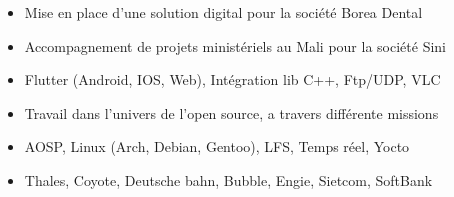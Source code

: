 \documentclass[10pt,a4paper]{altacv}
\begin{document}
\divider

\begin{itemize}
\item Mise en place d'une solution digital pour la société Borea Dental 
\item Accompagnement de projets ministériels au Mali pour la société Sini
\item Flutter (Android, IOS, Web), Intégration lib C++, Ftp/UDP, VLC
\end{itemize}


\divider

\begin{itemize}
\item Travail dans l'univers de l'open source, a travers différente missions 
\item AOSP, Linux (Arch, Debian, Gentoo), LFS, Temps réel, Yocto
\item Thales, Coyote, Deutsche bahn, Bubble, Engie, Sietcom, SoftBank
\end{itemize}



\clearpage

\end{document}
